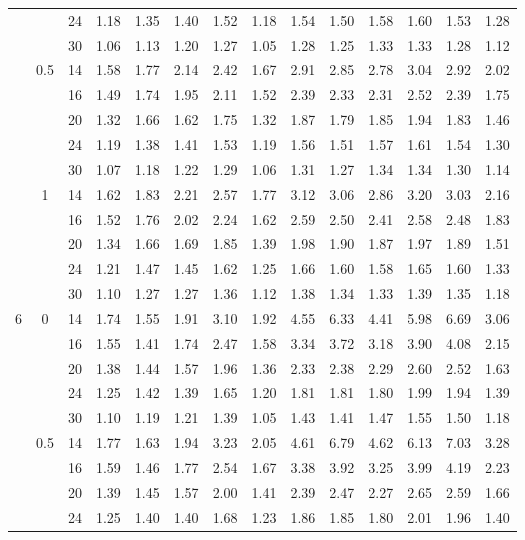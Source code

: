 \documentclass[num-refs]{wiley-article}
\begin{document}
\begin{table}[htbp!]
\begin{tabular}[t]{cccccccccccccc}
& & 24 & 1.18 & 1.35 & 1.40 & 1.52 & 1.18 & 1.54 & 1.50 & 1.58 & 1.60 & 1.53 & 1.28\\
& & 30 & 1.06 & 1.13 & 1.20 & 1.27 & 1.05 & 1.28 & 1.25 & 1.33 & 1.33 & 1.28 & 1.12\\
\hline
 & 0.5 & 14 & 1.58 & 1.77 & 2.14 & 2.42 & 1.67 & 2.91 & 2.85 & 2.78 & 3.04 & 2.92 & 2.02\\
& & 16 & 1.49 & 1.74 & 1.95 & 2.11 & 1.52 & 2.39 & 2.33 & 2.31 & 2.52 & 2.39 & 1.75\\
& & 20 & 1.32 & 1.66 & 1.62 & 1.75 & 1.32 & 1.87 & 1.79 & 1.85 & 1.94 & 1.83 & 1.46\\
& & 24 & 1.19 & 1.38 & 1.41 & 1.53 & 1.19 & 1.56 & 1.51 & 1.57 & 1.61 & 1.54 & 1.30\\
& & 30 & 1.07 & 1.18 & 1.22 & 1.29 & 1.06 & 1.31 & 1.27 & 1.34 & 1.34 & 1.30 & 1.14\\
\hline
 & 1 & 14 & 1.62 & 1.83 & 2.21 & 2.57 & 1.77 & 3.12 & 3.06 & 2.86 & 3.20 & 3.03 & 2.16\\
& & 16 & 1.52 & 1.76 & 2.02 & 2.24 & 1.62 & 2.59 & 2.50 & 2.41 & 2.58 & 2.48 & 1.83\\
& & 20 & 1.34 & 1.66 & 1.69 & 1.85 & 1.39 & 1.98 & 1.90 & 1.87 & 1.97 & 1.89 & 1.51\\
& & 24 & 1.21 & 1.47 & 1.45 & 1.62 & 1.25 & 1.66 & 1.60 & 1.58 & 1.65 & 1.60 & 1.33\\
& & 30 & 1.10 & 1.27 & 1.27 & 1.36 & 1.12 & 1.38 & 1.34 & 1.33 & 1.39 & 1.35 & 1.18\\
\hline
6 & 0 & 14 & 1.74 & 1.55 & 1.91 & 3.10 & 1.92 & 4.55 & 6.33 & 4.41 & 5.98 & 6.69 & 3.06\\
& & 16 & 1.55 & 1.41 & 1.74 & 2.47 & 1.58 & 3.34 & 3.72 & 3.18 & 3.90 & 4.08 & 2.15\\
& & 20 & 1.38 & 1.44 & 1.57 & 1.96 & 1.36 & 2.33 & 2.38 & 2.29 & 2.60 & 2.52 & 1.63\\
& & 24 & 1.25 & 1.42 & 1.39 & 1.65 & 1.20 & 1.81 & 1.81 & 1.80 & 1.99 & 1.94 & 1.39\\
& & 30 & 1.10 & 1.19 & 1.21 & 1.39 & 1.05 & 1.43 & 1.41 & 1.47 & 1.55 & 1.50 & 1.18\\
\hline
 & 0.5 & 14 & 1.77 & 1.63 & 1.94 & 3.23 & 2.05 & 4.61 & 6.79 & 4.62 & 6.13 & 7.03 & 3.28\\
& & 16 & 1.59 & 1.46 & 1.77 & 2.54 & 1.67 & 3.38 & 3.92 & 3.25 & 3.99 & 4.19 & 2.23\\
&& 20 & 1.39 & 1.45 & 1.57 & 2.00 & 1.41 & 2.39 & 2.47 & 2.27 & 2.65 & 2.59 & 1.66\\
& & 24 & 1.25 & 1.40 & 1.40 & 1.68 & 1.23 & 1.86 & 1.85 & 1.80 & 2.01 & 1.96 & 1.40\\

\end{tabular}
\end{table}
\end{document}

